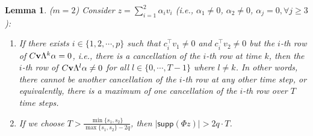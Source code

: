 \documentclass[journal]{IEEEtran}
\newtheorem{lem}{\bf{Lemma}}
\begin{document}
\begin{lem}\label{lem:two_vec}
($m=2$)  Consider $z = \sum_{i=1}^2 \alpha_i v_i $ (i.e.,  $\alpha_1 \neq 0$, $\alpha_2 \neq 0$, $\alpha_j = 0, \forall j\ge 3$):
\begin{enumerate}
\item 
If there exists $i \in \{1, 2, \cdots, p\}$ such that $c_i^\top v_1 \neq 0$ and $c_i^\top v_2 \neq 0$ but the $i$-th row of $C {\bf v} \Lambda^k \alpha = 0$, i.e., there is a cancellation of the $i$-th row at time $k$, then the $i$-th row of $C{\bf v} \Lambda^l \alpha \neq 0$ for all $l \in \{ 0, \cdots, T-1 \}$ where $l \neq k$. In other words, there cannot be another cancellation of the $i$-th row at any other time step, or equivalently, there is a maximum of one cancellation of the $i$-th row over $T$ time steps.
\item 
If we choose $T  >  \frac { \min \{s_1, s_2\}} { \max\{s_1, s_2\} - 2q }$, then $\lvert \textsf{supp} (\Phi z) \rvert > 2q\cdot T$. 
\end{enumerate}
\end{lem}
\end{document}
